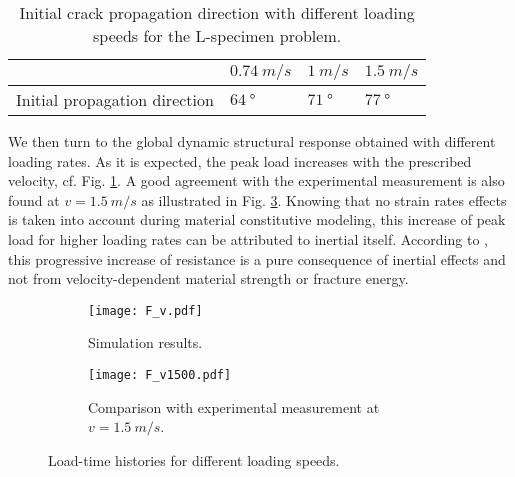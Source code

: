 \begin{table}[htbp]
\centering
\caption{Initial crack propagation direction with different loading speeds for the L-specimen problem.} \label{tab:initial_angle}
\begin{tabular}{llll} \toprule
& $\SI{0.74}{m/s}$ & $\SI{1}{m/s}$ & $\SI{1.5}{m/s}$ \\ \midrule
Initial propagation direction & $\SI{64}{\degree}$ & $\SI{71}{\degree}$ & $\SI{77}{\degree}$ \\ \bottomrule
\end{tabular}
\end{table}

We then turn to the global dynamic structural response obtained with different loading rates. As it is expected, the peak load increases with the prescribed velocity, cf. Fig. \ref{fig:F-t-L-sim}. A good agreement with the experimental measurement is also found at $v=\SI{1.5}{m/s}$ as illustrated in Fig. \ref{fig:F-t-L}. Knowing that no strain rates effects is taken into account during material constitutive modeling, this increase of peak load for higher loading rates can be attributed to inertial itself. According to \cite{OzboltBedeSharmaMayer:2015}, this progressive increase of resistance is a pure consequence of inertial effects and not from velocity-dependent material strength or fracture energy.
\begin{figure}[htbp]
\centering
\begin{subfigure}[b]{0.48\textwidth}
\centering
\texttt{[image: F\_v.pdf]}
\caption{Simulation results.} \label{fig:F-t-L-sim}
\end{subfigure}
\begin{subfigure}[b]{0.48\textwidth}
\centering
\texttt{[image: F\_v1500.pdf]}
\caption{Comparison with experimental measurement at $v=\SI{1.5}{m/s}$.} \label{fig:F-t-L}
\end{subfigure}
\caption{Load-time histories for different loading speeds.}
\end{figure}

